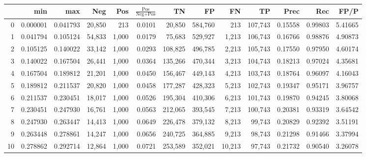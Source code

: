 \begin{tabular}{rrrrrrrrrrrrr}
\toprule
{} &       min &       max &     Neg &    Pos & $\frac{\text{Pos}}{\text{Neg}+\text{Pos}}$ &       TN &       FP &       FN &       TP &     Prec &      Rec &     FP/P \\
\midrule
0   &  0.000001 &  0.041793 &  20,850 &    213 &                                     0.0101 &   20,850 &  584,760 &      213 &  107,743 &  0.15558 &  0.99803 &  5.41665 \\
1   &  0.041794 &  0.105124 &  54,833 &  1,000 &                                     0.0179 &   75,683 &  529,927 &    1,213 &  106,743 &  0.16766 &  0.98876 &  4.90873 \\
2   &  0.105125 &  0.140022 &  33,142 &  1,000 &                                     0.0293 &  108,825 &  496,785 &    2,213 &  105,743 &  0.17550 &  0.97950 &  4.60174 \\
3   &  0.140022 &  0.167504 &  26,441 &  1,000 &                                     0.0364 &  135,266 &  470,344 &    3,213 &  104,743 &  0.18213 &  0.97024 &  4.35681 \\
4   &  0.167504 &  0.189812 &  21,201 &  1,000 &                                     0.0450 &  156,467 &  449,143 &    4,213 &  103,743 &  0.18764 &  0.96097 &  4.16043 \\
5   &  0.189812 &  0.211537 &  20,820 &  1,000 &                                     0.0458 &  177,287 &  428,323 &    5,213 &  102,743 &  0.19347 &  0.95171 &  3.96757 \\
6   &  0.211537 &  0.230451 &  18,017 &  1,000 &                                     0.0526 &  195,304 &  410,306 &    6,213 &  101,743 &  0.19870 &  0.94245 &  3.80068 \\
7   &  0.230451 &  0.247930 &  16,761 &  1,000 &                                     0.0563 &  212,065 &  393,545 &    7,213 &  100,743 &  0.20381 &  0.93319 &  3.64542 \\
8   &  0.247930 &  0.263447 &  14,413 &  1,000 &                                     0.0649 &  226,478 &  379,132 &    8,213 &   99,743 &  0.20829 &  0.92392 &  3.51191 \\
9   &  0.263448 &  0.278861 &  14,247 &  1,000 &                                     0.0656 &  240,725 &  364,885 &    9,213 &   98,743 &  0.21298 &  0.91466 &  3.37994 \\
10  &  0.278862 &  0.292714 &  12,864 &  1,000 &                                     0.0721 &  253,589 &  352,021 &   10,213 &   97,743 &  0.21732 &  0.90540 &  3.26078 \\

\end{tabular}
